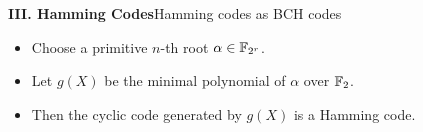 %
%
%
%

\begin{frame}{\textbf{III. Hamming Codes}}{Hamming codes as BCH codes}
\small
{}
\begin{itemize}
  \item Choose a primitive $n$-th root $\alpha\in\mathbb{F}_{2^r}$.
  \item Let $g(X)$ be the minimal polynomial of $\alpha$ over $\mathbb{F}_2$.
  \item Then the cyclic code generated by $g(X)$ is a Hamming code.
\end{itemize}
\end{frame}

